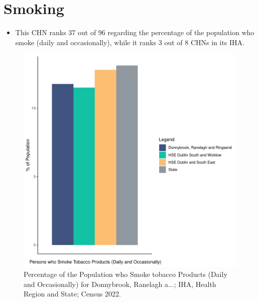 \documentclass{article}
\begin{document}
\pagebreak

\section{Smoking}\label{sect:Smoking}
\begin{itemize}
\item This CHN ranks  37 out of 96 regarding the percentage of the population who smoke (daily and occasionally), while it ranks   3 out of 8 CHNs in its IHA.
\end{itemize}
\begin{figure}[H]
	\centering
	\includegraphics[width = 120mm]{../figures/SmokingED.pdf}
	\caption{Percentage of the Population who Smoke tobacco Products (Daily and Occasionally) for Donnybrook, Ranelagh a...; IHA, Health Region and State; Census 2022.}
	\label{fig:2ae19629-1a6a-13a3-e055-000000000001}
	\end{figure}
	
\end{document}
